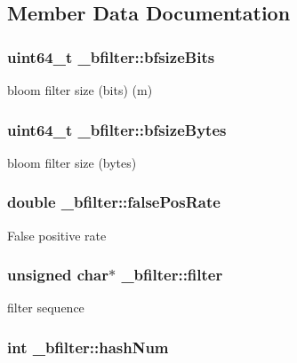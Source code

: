 \subsection{Member Data Documentation}
\hypertarget{struct__bfilter_adb5c576f93d920a3ad5250781698d6ff}{
\subsubsection[{bfsize\+Bits}]{\setlength{\rightskip}{0pt plus 5cm}uint64\+\_\+t \+\_\+bfilter\+::bfsize\+Bits}}\label{struct__bfilter_adb5c576f93d920a3ad5250781698d6ff}
bloom filter size (bits) (m) \hypertarget{struct__bfilter_a61487a85ddb47e6642f8c805f4d2f041}{
\subsubsection[{bfsize\+Bytes}]{\setlength{\rightskip}{0pt plus 5cm}uint64\+\_\+t \+\_\+bfilter\+::bfsize\+Bytes}}\label{struct__bfilter_a61487a85ddb47e6642f8c805f4d2f041}
bloom filter size (bytes) \hypertarget{struct__bfilter_a7a87113cbc7834ff20dd1f40cd06973c}{
\subsubsection[{false\+Pos\+Rate}]{\setlength{\rightskip}{0pt plus 5cm}double \+\_\+bfilter\+::false\+Pos\+Rate}}\label{struct__bfilter_a7a87113cbc7834ff20dd1f40cd06973c}
False positive rate \hypertarget{struct__bfilter_a259a669cdf8b5a8da27e8346c1edea32}{
\subsubsection[{filter}]{\setlength{\rightskip}{0pt plus 5cm}unsigned char$\ast$ \+\_\+bfilter\+::filter}}\label{struct__bfilter_a259a669cdf8b5a8da27e8346c1edea32}
filter sequence \hypertarget{struct__bfilter_ab1c41e821137ae9d35a240c67819d51f}{
\subsubsection[{hash\+Num}]{\setlength{\rightskip}{0pt plus 5cm}int \+\_\+bfilter\+::hash\+Num}}\label{struct__bfilter_ab1c41e821137ae9d35a240c67819d51f}
